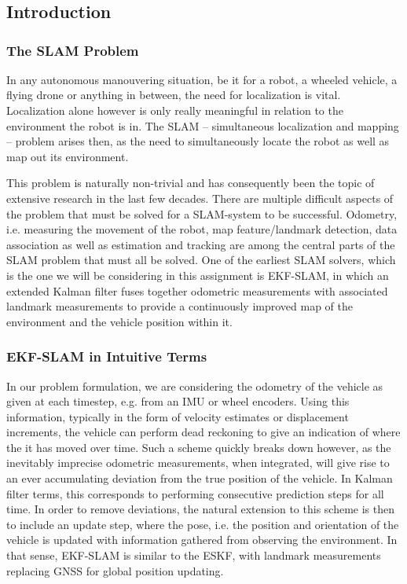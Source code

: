 \section{}
\subsection{Introduction}
\subsubsection{The SLAM Problem}
In any autonomous manouvering situation, be it for a robot, a wheeled vehicle, a flying drone or anything in between, the need for localization is vital.
Localization alone however is only really meaningful in relation to the environment the robot is in.
The SLAM – simultaneous localization and mapping – problem arises then, as the need to simultaneously locate the robot as well as map out its environment.

This problem is naturally non-trivial and has consequently been the topic of extensive research in the last few decades.
There are multiple difficult aspects of the problem that must be solved for a SLAM-system to be successful.
Odometry, i.e. measuring the movement of the robot, map feature/landmark detection, data association as well as estimation and tracking are among the central parts of the SLAM problem that must all be solved.
One of the earliest SLAM solvers, which is the one we will be considering in this assignment is EKF-SLAM, in which an extended Kalman filter fuses together odometric measurements with associated landmark measurements to provide a continuously improved map of the environment and the vehicle position within it.

\subsubsection{EKF-SLAM in Intuitive Terms}
In our problem formulation, we are considering the odometry of the vehicle as given at each timestep, e.g. from an IMU or wheel encoders.
Using this information, typically in the form of velocity estimates or displacement increments, the vehicle can perform dead reckoning to give an indication of where the it has moved over time.
Such a scheme quickly breaks down however, as the inevitably imprecise odometric measurements, when integrated, will give rise to an ever accumulating deviation from the true position of the vehicle. In Kalman filter terms, this corresponds to performing consecutive prediction steps for all time. In order to remove deviations, the natural extension to this scheme is then to include an update step, where the pose, i.e. the position and orientation of the vehicle is updated with information gathered from observing the environment. In that sense, EKF-SLAM is similar to the ESKF, with landmark measurements replacing GNSS for global position updating.


